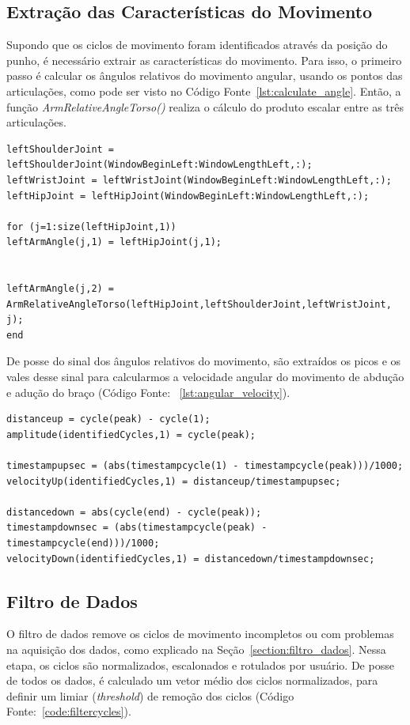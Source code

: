 \subsection{Extração das Características do Movimento}
Supondo que os ciclos de movimento foram identificados através da posição do punho, é necessário extrair as características do movimento. Para isso, o primeiro passo é calcular os ângulos relativos do movimento angular, usando os pontos das articulações, como pode ser visto no Código Fonte~\ref{lst:calculate_angle}. Então, a função \textit{ArmRelativeAngleTorso()} realiza o cálculo do produto escalar entre as três articulações.

\begin{lstlisting}[frame=single, caption=Calcular ângulos relativos do movimento, label=lst:calculate_angle]
leftShoulderJoint = leftShoulderJoint(WindowBeginLeft:WindowLengthLeft,:);
leftWristJoint = leftWristJoint(WindowBeginLeft:WindowLengthLeft,:);  
leftHipJoint = leftHipJoint(WindowBeginLeft:WindowLengthLeft,:);  

for (j=1:size(leftHipJoint,1))
leftArmAngle(j,1) = leftHipJoint(j,1);
        

leftArmAngle(j,2) = ArmRelativeAngleTorso(leftHipJoint,leftShoulderJoint,leftWristJoint, j);    
end
\end{lstlisting}

De posse do sinal dos ângulos relativos do movimento, são extraídos os picos e os vales desse sinal para calcularmos a velocidade angular do movimento de abdução e adução do braço (Código Fonte: ~\ref{lst:angular_velocity}).
    
\begin{lstlisting}[frame=single, caption=Calcular velocidade angular da adução e abdução, label=lst:angular_velocity]	
distanceup = cycle(peak) - cycle(1);
amplitude(identifiedCycles,1) = cycle(peak);
    
timestampupsec = (abs(timestampcycle(1) - timestampcycle(peak)))/1000;
velocityUp(identifiedCycles,1) = distanceup/timestampupsec;

distancedown = abs(cycle(end) - cycle(peak));
timestampdownsec = (abs(timestampcycle(peak) - timestampcycle(end)))/1000;
velocityDown(identifiedCycles,1) = distancedown/timestampdownsec;
\end{lstlisting}	
		
\subsection{Filtro de Dados}
O filtro de dados remove os ciclos de movimento incompletos ou com problemas na aquisição dos dados, como explicado na Seção~\ref{section:filtro_dados}. Nessa etapa, os ciclos são normalizados, escalonados e rotulados por usuário. 
De posse de todos os dados, é calculado um vetor médio dos ciclos normalizados, para definir um limiar (\textit{threshold}) de remoção dos ciclos (Código Fonte:~\ref{code:filtercycles}).

